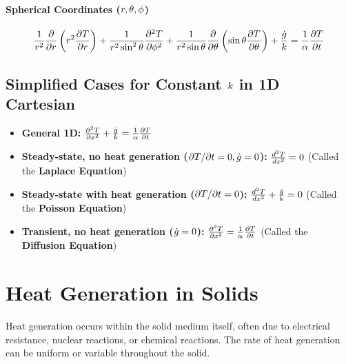 \paragraph*{Spherical Coordinates ($r, \theta, \phi$)}
\begin{equation}
\label{eq:hce_spherical_constant_k_theory}
    \frac{1}{r^2} \frac{\partial}{\partial r}\left(r^2 \frac{\partial T}{\partial r}\right) + \frac{1}{r^2 \sin^2 \theta} \frac{\partial^2 T}{\partial \phi^2} + \frac{1}{r^2 \sin \theta} \frac{\partial}{\partial \theta}\left(\sin \theta \frac{\partial T}{\partial \theta}\right) + \frac{\dot{g}}{k} = \frac{1}{\alpha} \frac{\partial T}{\partial t}
\end{equation}

\subsection{Simplified Cases for Constant $k$ in 1D Cartesian}
\begin{itemize}
    \item \textbf{General 1D:} $\frac{\partial^2 T}{\partial x^2} + \frac{\dot{g}}{k} = \frac{1}{\alpha} \frac{\partial T}{\partial t}$
    \item \textbf{Steady-state, no heat generation ($\partial T / \partial t = 0, \dot{g} = 0$):} $\frac{d^2 T}{d x^2} = 0$ \quad (Called the \textbf{Laplace Equation})
    \item \textbf{Steady-state with heat generation ($\partial T / \partial t = 0$):} $\frac{d^2 T}{d x^2} + \frac{\dot{g}}{k} = 0$ \quad (Called the \textbf{Poisson Equation})
    \item \textbf{Transient, no heat generation ($\dot{g} = 0$):} $\frac{\partial^2 T}{\partial x^2} = \frac{1}{\alpha} \frac{\partial T}{\partial t}$ \quad (Called the \textbf{Diffusion Equation})
\end{itemize}

\section{Heat Generation in Solids}
Heat generation occurs within the solid medium itself, often due to electrical resistance, nuclear reactions, or chemical reactions. The rate of heat generation can be uniform or variable throughout the solid.

